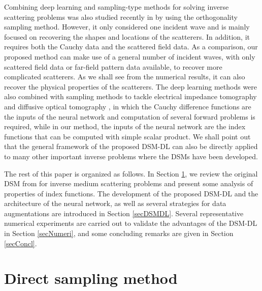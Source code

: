 \documentclass{article}
\begin{document}
	Combining deep learning and sampling-type methods for solving inverse scattering problems was also studied recently in \cite{le2022sampling} by using the orthogonality sampling method. However, it only considered one incident wave and is mainly focused on recovering the shapes and locations of the scatterers. In addition, it requires both the Cauchy data and the scattered field data. As a comparison, our proposed method can make use of a general number of incident waves, with only scattered field data or far-field pattern data available, to recover more complicated scatterers. As we shall see from the numerical results, it can also recover the physical properties of the scatterers. The deep learning methods were also combined with sampling methods to tackle electrical impedance tomography \cite{guo2021construct} and diffusive optical tomography \cite{jiang2021learn}, in which the Cauchy difference functions are the inputs of the neural network and computation of several forward problems is required, while in our method, the inputs of the neural network are the index functions that can be computed with simple scalar product. We shall point out that the general framework of the proposed DSM-DL can also be directly applied to many other important inverse problems where the DSMs have been developed. 
	
	The rest of this paper is organized as follows. In Section \ref{secDSM}, we review the original DSM from \cite{ito2012direct} for inverse medium scattering problems and present some analysis of properties of index functions. The development of the proposed DSM-DL and the architecture of the neural network, as well as several strategies for data augmentations are introduced in Section \ref{secDSMDL}. Several representative numerical experiments are carried out to validate the advantages of the DSM-DL in Section \ref{secNumeri}, and some concluding remarks are given in Section \ref{secConcl}.
	
	
	
	\section{Direct sampling method}\label{secDSM}
	
\end{document}
